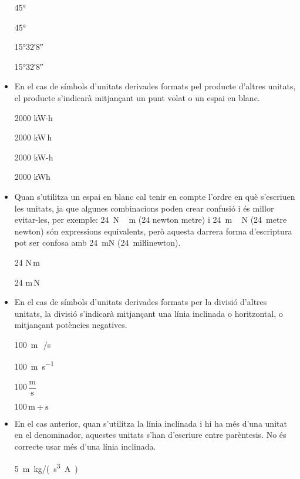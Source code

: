 \begin{itemize}
\textcolor{Green}\faCheckSquare{} \ang{45}

\textcolor{Red}\faTimesCircle{} \ang[number-angle-product = \,]{45}

\textcolor{Green}\faCheckSquare{} \ang{15;32;8}

\textcolor{Red}\faTimesCircle{} \ang[number-angle-product = \,]{15;32;8}

\item En el cas de símbols d'unitats derivades formats pel producte
d'altres unitats, el producte s'indicarà mitjançant un punt volat o
un espai en blanc.

\textcolor{Green}\faCheckSquare{} 2000 kW$\cdot$h

\textcolor{Green}\faCheckSquare{} 2000 kW\,h

\textcolor{Red}\faTimesCircle{} 2000 kW-h

\textcolor{Red}\faTimesCircle{} 2000 kWh

\item Quan s'utilitza un espai en blanc cal tenir en compte  l'ordre en què s'escriuen
les unitats, ja que algunes combinacions poden crear confusió i
és millor evitar-les, per exemple: \qty{24}{N\,m} (24 newton metre) i
\qty{24}{m\,N} (24~metre newton) són expressions equivalents, però
aquesta darrera forma d'escriptura pot ser confosa amb \qty{24}{mN} (24~miŀlinewton).

\textcolor{Green}\faCheckSquare{} 24 N\,m

\textcolor{Blue}\faExclamationTriangle{} 24 m\,N

\item En el cas de símbols d'unitats derivades formats per la divisió
d'altres unitats, la divisió s'indicarà mitjançant una línia
inclinada o horitzontal, o mitjançant potències negatives.

\textcolor{Green}\faCheckSquare{} \qty{100}{m\,/s}

\textcolor{Green}\faCheckSquare{} \qty{100}{m.s^{-1}}

\textcolor{Green}\faCheckSquare{} $100\,\dfrac{\text{m}}{\text{s}}$

\textcolor{Red}\faTimesCircle{} $100\,\text{m}\div\text{s}$

\item En el cas anterior, quan s'utilitza la línia inclinada i hi ha més
d'una unitat en el denominador, aquestes unitats s'han d'escriure
entre parèntesis. No és correcte usar més d'una línia inclinada.

\textcolor{Green}\faCheckSquare{} \qty{5}{m.kg/(s^3.A)}


\end{itemize}
